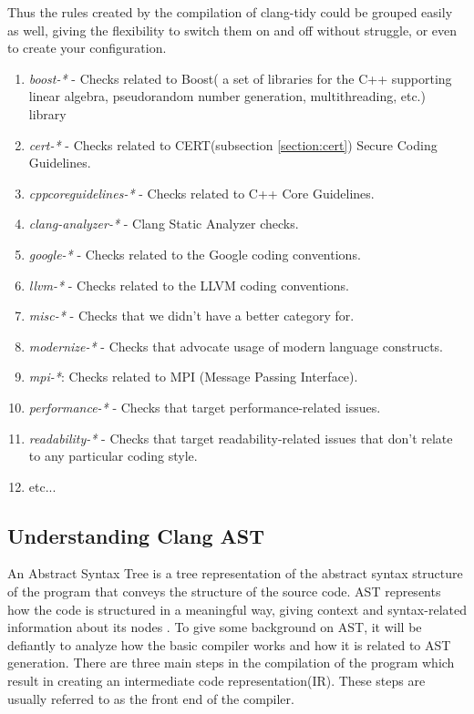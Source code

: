Thus the rules created by the compilation of clang-tidy could be grouped easily as well, giving the flexibility to switch them on and off without struggle, or even to create your configuration.  

\begin{enumerate}
    \item \textit{boost-*} - Checks related to Boost( a set of libraries for the C++ supporting linear algebra, pseudorandom number generation, multithreading, etc.) library
    \item \textit{cert-*} - Checks related to CERT(subsection \ref{section:cert}) Secure Coding Guidelines.
    \item \textit{cppcoreguidelines-*} - Checks related to C++ Core Guidelines.
    \item \textit{clang-analyzer-*} - Clang Static Analyzer checks.
    \item \textit{google-*} - Checks related to the Google coding conventions.
    \item \textit{llvm-*} - Checks related to the LLVM coding conventions.
    \item \textit{misc-*} - Checks that we didn’t have a better category for.
    \item \textit{modernize-*} - Checks that advocate usage of modern language constructs.
    \item \textit{mpi-*}: Checks related to MPI (Message Passing Interface).
    \item \textit{performance-*} - Checks that target performance-related issues.
    \item \textit{readability-*} - Checks that target readability-related issues that don’t relate
    to any particular coding style.
    \item etc...
\end{enumerate}


\subsection{Understanding Clang AST}

An Abstract Syntax Tree is a tree representation of the abstract syntax structure of the program that conveys the structure of the source code. AST represents how the code is structured in a meaningful way, giving context and syntax-related information about its nodes \cite{ast-definition}. To give some background on AST, it will be defiantly to analyze how the basic compiler works and how it is related to AST generation. There are three main steps in the compilation of the program which result in creating an intermediate code representation(IR). These steps are usually referred to as the front end of the compiler. 

